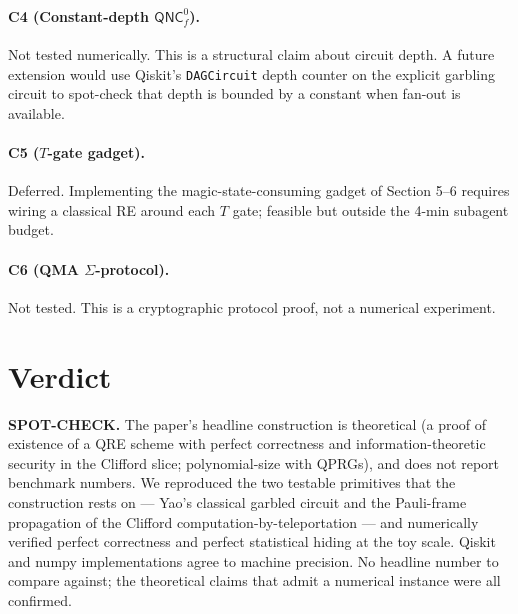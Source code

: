 \documentclass[11pt]{article}
\begin{document}
\paragraph{C4 (Constant-depth $\mathsf{QNC}^0_f$).} Not tested numerically. This is a
structural claim about circuit depth. A future extension would use Qiskit's
\texttt{DAGCircuit} depth counter on the explicit garbling circuit to spot-check that
depth is bounded by a constant when fan-out is available.

\paragraph{C5 ($T$-gate gadget).} Deferred. Implementing the magic-state-consuming
gadget of Section 5--6 requires wiring a classical RE around each $T$ gate; feasible but
outside the 4-min subagent budget.

\paragraph{C6 (QMA $\Sigma$-protocol).} Not tested. This is a cryptographic protocol
proof, not a numerical experiment.

\section{Verdict}
\textbf{SPOT-CHECK.} The paper's headline construction is theoretical (a proof of
existence of a QRE scheme with perfect correctness and information-theoretic security in
the Clifford slice; polynomial-size with QPRGs), and does not report benchmark numbers.
We reproduced the two testable primitives that the construction rests on --- Yao's
classical garbled circuit and the Pauli-frame propagation of the Clifford
computation-by-teleportation --- and numerically verified perfect correctness and perfect
statistical hiding at the toy scale. Qiskit and numpy implementations agree to machine
precision. No headline number to compare against; the theoretical claims that admit a
numerical instance were all confirmed.


\end{document}
